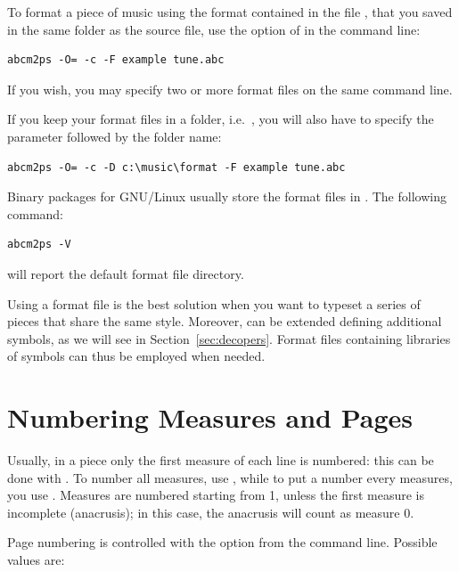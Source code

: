 \documentclass[a4paper,fullpage,12pt]{book}
\begin{document}
To format a piece of music using the format contained in the file
, that you saved in the same folder as the source
file, use the option  of \abcm{} in the command line:

\begin{verbatim}
abcm2ps -O= -c -F example tune.abc
\end{verbatim}

If you wish, you may specify two or more format files on the same
command line.

If you keep your format files in a folder, i.e.\ 
, you will also have to specify the
\file{-D} parameter followed by the folder name:

\begin{verbatim}
abcm2ps -O= -c -D c:\music\format -F example tune.abc
\end{verbatim}

Binary packages for GNU/Linux usually store the format files in
. The following command:

\begin{verbatim}
abcm2ps -V
\end{verbatim}

will report the default format file directory.

Using a format file is the best solution when you want to typeset a
series of pieces that share the same style. Moreover, \abcm{} can be
extended defining additional symbols, as we will see in
Section~\ref{sec:decopers}. Format files containing libraries of
symbols can thus be employed when needed.


\section{Numbering Measures and Pages}

Usually, in a piece only the first measure of each line is numbered:
this can be done with \metacmd{measurenb 0}. To number all measures,
use \metacmd{measurenb 1}, while to put a number every 
measures, you use  \parm{n}. Measures are numbered
starting from 1, unless the first measure is incomplete (anacrusis);
in this case, the anacrusis will count as measure 0.

Page numbering is controlled with the option  
from the \abcm{} command line. Possible values are:
\end{document}
